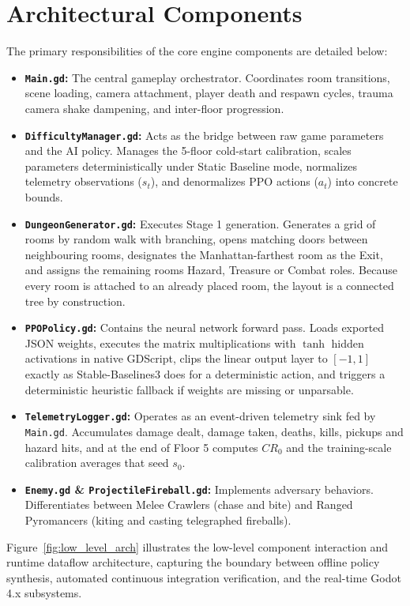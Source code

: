 \section{Architectural Components}
The primary responsibilities of the core engine components are detailed below:
\begin{itemize}
    \item \textbf{\texttt{Main.gd}:} The central gameplay orchestrator. Coordinates room transitions, scene loading, camera attachment, player death and respawn cycles, trauma camera shake dampening, and inter-floor progression.
    \item \textbf{\texttt{DifficultyManager.gd}:} Acts as the bridge between raw game parameters and the AI policy. Manages the 5-floor cold-start calibration, scales parameters deterministically under Static Baseline mode, normalizes telemetry observations ($s_t$), and denormalizes PPO actions ($a_t$) into concrete bounds.
    \item \textbf{\texttt{DungeonGenerator.gd}:} Executes Stage 1 generation. Generates a grid of rooms by random walk with branching, opens matching doors between neighbouring rooms, designates the Manhattan-farthest room as the Exit, and assigns the remaining rooms Hazard, Treasure or Combat roles. Because every room is attached to an already placed room, the layout is a connected tree by construction.
    \item \textbf{\texttt{PPOPolicy.gd}:} Contains the neural network forward pass. Loads exported JSON weights, executes the matrix multiplications with $\tanh$ hidden activations in native GDScript, clips the linear output layer to $[-1,1]$ exactly as Stable-Baselines3 does for a deterministic action, and triggers a deterministic heuristic fallback if weights are missing or unparsable.
    \item \textbf{\texttt{TelemetryLogger.gd}:} Operates as an event-driven telemetry sink fed by \texttt{Main.gd}. Accumulates damage dealt, damage taken, deaths, kills, pickups and hazard hits, and at the end of Floor 5 computes $CR_0$ and the training-scale calibration averages that seed $s_0$.
    \item \textbf{\texttt{Enemy.gd} \& \texttt{ProjectileFireball.gd}:} Implements adversary behaviors. Differentiates between Melee Crawlers (chase and bite) and Ranged Pyromancers (kiting and casting telegraphed fireballs).
\end{itemize}

Figure~\ref{fig:low_level_arch} illustrates the low-level component interaction and runtime dataflow architecture, capturing the boundary between offline policy synthesis, automated continuous integration verification, and the real-time Godot 4.x subsystems.

